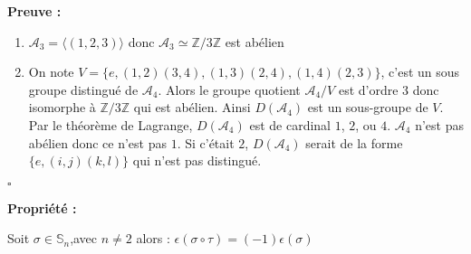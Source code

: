 \documentclass{report}
\renewenvironment{leftbar}{%
  \def\FrameCommand{\vrule width 0.4pt \hspace{10pt}}%
  \MakeFramed {\advance\hsize-\width \FrameRestore}}%
 {\endMakeFramed}%
\newenvironment{preuve}{\vspace*{0.5cm}
    \begin{leftbar}
    \noindent\textbf{Preuve :}\par}{
    \begin{flushright}
    $\square$
    \end{flushright}
    \end{leftbar}
}
\newenvironment{prop}{\begin{tcolorbox}[colframe= white]
    \textbf{Propriété :}
     \par}
    {\end{tcolorbox}}
\newcommand{\Z}{\mathbb{Z}}
\newcommand{\sn}{\mathbb{S}_n}
\newcommand{\sign}{\epsilon(\sigma)}
\begin{document}
\begin{preuve}
\begin{enumerate}
\item $\mathcal{A}_3 = \langle (1,2,3) \rangle$ donc $\mathcal{A}_3\simeq \Z/3\Z$ est abélien
\item On note $V = \{e,(1,2)(3,4),(1,3)(2,4),(1,4)(2,3)\}$, c'est un sous groupe distingué de $\mathcal{A}_4$. Alors le groupe quotient $\mathcal{A}_4/V$ est d'ordre 3 donc isomorphe à $\Z/3\Z$ qui est abélien. Ainsi $D(\mathcal{A}_4)$ est un sous-groupe de $V$. Par le théorème de Lagrange, $D(\mathcal{A}_4)$ est de cardinal $1$, $2$, ou $4$. $\mathcal{A}_4$ n'est pas abélien donc ce n'est pas $1$. Si c'était $2$, $D(\mathcal{A}_4)$ serait de la forme $\{e, (i,j)(k,l)\}$ qui n'est pas distingué.
\end{enumerate}
\end{preuve}

\begin{prop}
Soit $\sigma \in \sn$,avec $n\neq2 $ alors : $\epsilon(\sigma\circ\tau) = (-1)\sign$
\end{prop}
\end{document}
